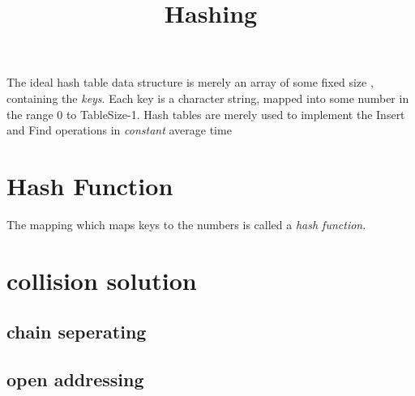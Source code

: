 \documentclass{article}
\title{Hashing}
\begin{document}
\maketitle
The ideal hash table data structure is merely an array of some fixed size , containing the \emph{keys}. Each key is a character string, mapped into some number in the range 0 to TableSize-1. 
Hash tables are merely used to implement the Insert and Find operations in \emph{constant} average time 
\section{Hash Function}
The mapping which maps keys to the numbers is called a \emph{hash function}.
\section{collision solution}
\subsection{chain seperating}
\subsection{open addressing}
\end{document}

